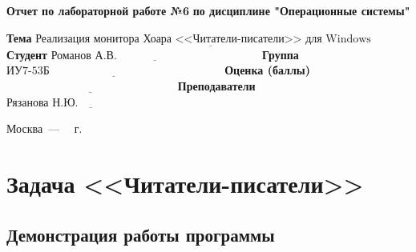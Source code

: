 \documentclass[12pt]{report}
\begin{document}
\begin{titlepage}
	\begin{center}
		\noindent\begin{minipage}{1.3\textwidth}\centering
			\Large\textbf{  Отчет по лабораторной работе №6}\newline
			\textbf{по дисциплине "Операционные системы"}\newline\newline
		\end{minipage}
	\end{center}
	
	\noindent\textbf{Тема} $\underline{\text{Реализация монитора Хоара <<Читатели-писатели>> для Windows~~~~}}$\newline\newline
	\noindent\textbf{Студент} $\underline{\text{Романов А.В.~~~~~~~~~~~~~~~~~~~~~~~~~~~~~~~~~~~~~~}}$\newline\newline
	\noindent\textbf{Группа} $\underline{\text{ИУ7-53Б~~~~~~~~~~~~~~~~~~~~~~~~~~~~~~~~~~~~~~~~~~~~~~}}$\newline\newline
	\noindent\textbf{Оценка (баллы)} $\underline{\text{~~~~~~~~~~~~~~~~~~~~~~~~~~~~~~~~~~~~~~~~~~~~~}}$\newline\newline
	\noindent\textbf{Преподаватели} $\underline{\text{Рязанова Н.Ю.~~~~~~~~~~~~~~~~~~~~~~~~~~}}$\newline\newline\newline
	
	\begin{center}
		\vfill
		Москва~---~\the\year
		~г.
	\end{center}
\end{titlepage}

\chapter{Задача <<Читатели-писатели>>}

\section{Демонстрация работы программы}
\end{document}
